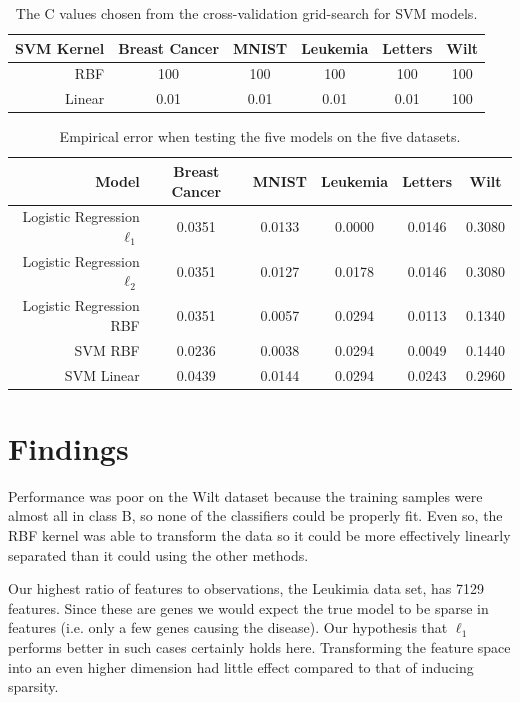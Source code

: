 \documentclass[letterpaper, 11pt]{article}
\begin{document}
\begin{table}[h]
  \centering
  \begin{tabular}{r|c c c c c}
     SVM Kernel & Breast Cancer & MNIST & Leukemia & Letters & Wilt \\
     \hline
      RBF  & 100 & 100 & 100 & 100 & 100 \\
      Linear & 0.01 & 0.01 & 0.01 & 0.01 & 100 \\
\end{tabular}
      \caption{The C values chosen from the cross-validation grid-search for SVM models.}
\end{table}

\begin{table}[h]
  \centering
  \begin{tabular}{r|c c c c c}
     Model & Breast Cancer & MNIST & Leukemia & Letters & Wilt \\
     \hline
      Logistic Regression $\ell_1$ & 0.0351 & 0.0133 & 0.0000 & 0.0146 & 0.3080 \\
      Logistic Regression $\ell_2$ & 0.0351 & 0.0127 & 0.0178 & 0.0146 & 0.3080 \\
      Logistic Regression RBF      & 0.0351 & 0.0057 & 0.0294 & 0.0113 & 0.1340 \\
      SVM RBF                      & 0.0236 & 0.0038 & 0.0294 & 0.0049 & 0.1440 \\
      SVM Linear                   & 0.0439 & 0.0144 & 0.0294 & 0.0243 & 0.2960 \\
\end{tabular}
      \caption{Empirical error when testing the five models on the five datasets.}
\end{table}

\section{Findings}

Performance was poor on the Wilt dataset because the training samples were almost all in class B, so none of the classifiers could be properly fit. Even so, the RBF kernel was able to transform the data so it could be more effectively linearly separated than it could using the other methods.

Our highest ratio of features to observations, the Leukimia data set, has 7129 features. Since these are genes we would expect the true model to be sparse in features (i.e. only a few genes causing the disease). Our hypothesis that $\ell_1$ performs better in such cases certainly holds here. Transforming the feature space into an even higher dimension had little effect compared to that of inducing sparsity.
\end{document}
